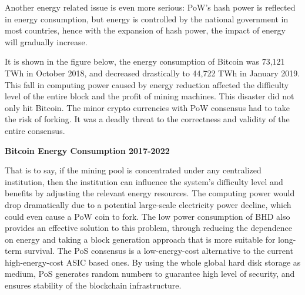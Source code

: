 \begin{flushleft}
    Another energy related issue is even more serious: PoW's hash power is reflected in energy consumption, but energy is controlled by the national government in most countries, hence with the expansion of hash power, the impact of energy will gradually increase.
\end{flushleft}
\begin{flushleft}
    It is shown in the figure below, the energy consumption of Bitcoin was 73,121 TWh in October 2018, and decreased drastically to 44,722 TWh in January 2019. This fall in computing power caused by energy reduction affected the difficulty level of the entire block and the profit of mining machines. This disaster did not only hit Bitcoin. The minor crypto currencies with PoW consensus had to take the risk of forking. It was a deadly threat to the correctness and validity of the entire consensus.
\end{flushleft}
\begin{flushleft}
    \centering\textbf{Bitcoin Energy Consumption 2017-2022}
\end{flushleft}

\begin{flushleft}
    That is to say, if the mining pool is concentrated under any centralized institution, then the institution can influence the system's difficulty level and benefits by adjusting the relevant energy resources. The computing power would drop dramatically due to a potential large-scale electricity power decline, which could even cause a PoW coin to fork. The low power consumption of BHD also provides an effective solution to this problem, through reducing the dependence on energy and taking a block generation approach that is more suitable for long-term survival. The PoS consensus is a low-energy-cost alternative to the current high-energy-cost ASIC based ones. By using the whole global hard disk storage as medium, PoS generates random numbers to guarantee high level of security, and ensures stability of the blockchain infrastructure.
\end{flushleft}
